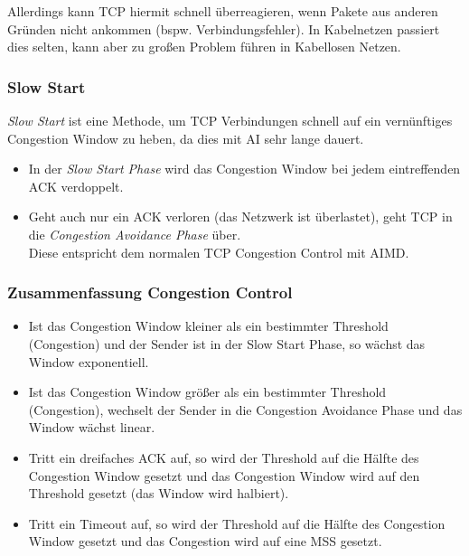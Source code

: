 \documentclass[a4paper, 11pt, accentcolor = tud3b]{tudreport}
\begin{document}
                    Allerdings kann TCP hiermit schnell überreagieren, wenn Pakete aus anderen Gründen nicht ankommen (bspw. Verbindungsfehler). In Kabelnetzen passiert dies selten, kann aber zu großen Problem führen in Kabellosen Netzen.

                \subsubsection{Slow Start}
                    \textit{Slow Start} ist eine Methode, um TCP Verbindungen schnell auf ein vernünftiges Congestion Window zu heben, da dies mit AI sehr lange dauert.
                    
                    \begin{itemize}
                    	\item In der \textit{Slow Start Phase} wird das Congestion Window bei jedem eintreffenden ACK verdoppelt.
                    	\item Geht auch nur ein ACK verloren (das Netzwerk ist überlastet), geht TCP in die \textit{Congestion Avoidance Phase} über. \\ Diese entspricht dem normalen TCP Congestion Control mit AIMD.
                    \end{itemize}
                
                \subsubsection{Zusammenfassung Congestion Control}
	                \begin{itemize}
	                	\item Ist das Congestion Window kleiner als ein bestimmter Threshold (Congestion) und der Sender ist in der Slow Start Phase, so wächst das Window exponentiell.
	                	\item Ist das Congestion Window größer als ein bestimmter Threshold (Congestion), wechselt der Sender in die Congestion Avoidance Phase und das Window wächst linear.
	                	\item Tritt ein dreifaches ACK auf, so wird der Threshold auf die Hälfte des Congestion Window gesetzt und das Congestion Window wird auf den Threshold gesetzt (das Window wird halbiert).
	                	\item Tritt ein Timeout auf, so wird der Threshold auf die Hälfte des Congestion Window gesetzt und das Congestion wird auf eine MSS gesetzt.
	                \end{itemize}
\end{document}
